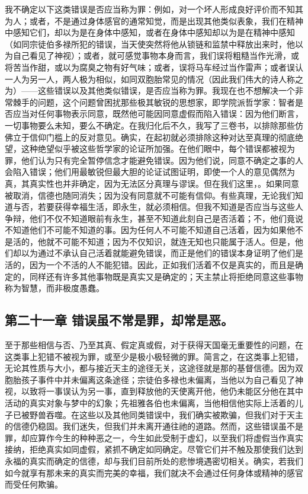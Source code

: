 我不确定以下这类错误是否应当称为罪：例如，对一个坏人形成良好评价而不知其为人；或者，不是通过身体感官的通常知觉，而是出现其他类似表象，我们在精神中感知它们，却以为是在身体中感知，或者在身体中感知却以为是在精神中感知（如同宗徒伯多禄所犯的错误，当天使突然将他从锁链和监禁中释放出来时，他以为自己看见了神视）；或者，就可感觉事物本身而言，我们误将粗糙当作光滑，或将苦当作甜，或以为腐臭之物有好气味；或者，误将马车经过当作雷声；或者误认一人为另一人，两人极为相似，如同双胞胎常见的情况（因此我们伟大的诗人称之为）——这些错误以及其他类似错误，是否应当称为罪。我现在也不想解决一个非常棘手的问题，这个问题曾困扰那些极其敏锐的思想家，即学院派哲学家：智者是否应当对任何事物表示同意，既然他可能因同意虚假而陷入错误：因为他们断言，一切事物要么未知，要么不确定。在我归化后不久，我写了三卷书，以排除那些仿佛立于信仰门槛上的反对意见。确实，在起初就必须排除这种对达至真理的彻底绝望，这种绝望似乎被这些哲学家的论证所加强。在他们眼中，每个错误都被视为罪，他们认为只有完全暂停信念才能避免错误。因为他们说，同意不确定之事的人会陷入错误；他们用最敏锐但最大胆的论证试图证明，即使一个人的意见偶然为真，其真实性也并非确定，因为无法区分真理与谬误。但在我们这里，。如果同意被取消，信德也随同消失；因为没有同意就不可能有信仰。有些真理，无论我们知道与否，若要获得幸福生活，即永生，就必须相信。但我不知道是否应当与这些人争辩，他们不仅不知道眼前有永生，甚至不知道此刻自己是否活着；不，他们竟说不知道他们不可能不知道的事。因为任何人不可能不知道自己活着，因为如果他不是活的，他就不可能不知道；因为不仅知识，就连无知也只能属于活人。但是，他们却以为通过不承认自己活着就能避免错误，而正是他们的错误本身证明了他们是活的，因为一个不活的人不能犯错。因此，正如我们活着不仅是真实的，而且是确定的，同样还有许多其他事物既是真实又是确定的；天主禁止将拒绝同意这些事物称为智慧，而非极度愚蠢。\par


\subsection{第二十一章 错误虽不常是罪，却常是恶。}

至于那些相信与否、乃至其真、假定真或假，对于获得天国毫无重要性的问题，在这类事上犯错不被视为罪，或至少是极小极轻微的罪。简言之，在这类事上犯错，无论其性质与大小，都与接近天主的途径无关，这途径就是那的基督信德。因为双胞胎孩子事件中并未偏离这条途径；宗徒伯多禄也未偏离，当他以为自己看见了神视，以致将一事误认为另一事，直到释放他的天使离开他，他仍未能区分他在其中活动的真实对象与梦中的幻象；先祖雅各伯也未偏离，当他相信他实际上活着的儿子已被野兽吞噬。在这些以及其他同类错误中，我们确实被欺骗，但我们对于天主的信德仍稳固。我们迷失，但我们并未离开通往祂的道路。然而，这些错误虽不是罪，却应算作今生的种种恶之一，今生如此受制于虚幻，以至我们将虚假当作真实接纳，拒绝真实如同虚假，紧抓不确定如同确定。尽管它们并不触及那使我们达到永福的真实而确定的信德，却与我们目前所处的悲惨境遇密切相关。确实，若我们如今就享有那未来的真实而完美的幸福，我们就决不会通过任何身体或精神的感官而受任何欺骗。\par

